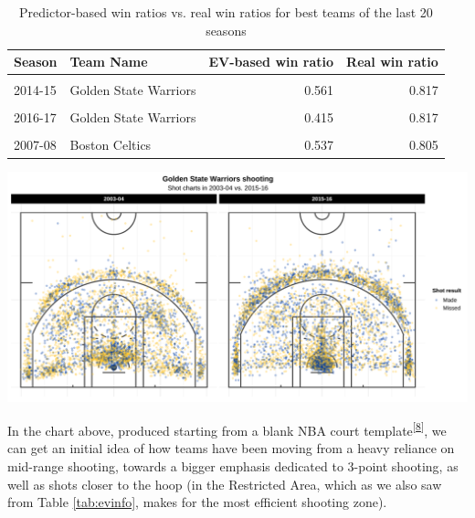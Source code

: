 \documentclass[
  12pt,
  a4paper,
]{article}
\let\origfigure\figure
\let\endorigfigure\endfigure
\renewenvironment{figure}[1][2] {
    \expandafter\origfigure\expandafter[H]
} {
    \endorigfigure
}
\begin{document}
\begin{table}[H]

\caption{\label{tab:teamspct}Predictor-based win ratios
                 vs. real win ratios for best
                 teams of the last 20 seasons}
\centering
\begin{tabular}[t]{llrr}
\toprule
Season & Team Name & EV-based win ratio & Real win ratio\\
\midrule
\cellcolor{gray!30}{2015-16} & \cellcolor{gray!30}{Golden State Warriors} & \cellcolor{gray!30}{0.573} & \cellcolor{gray!30}{0.890}\\
2014-15 & Golden State Warriors & 0.561 & 0.817\\
\cellcolor{gray!30}{2015-16} & \cellcolor{gray!30}{San Antonio Spurs} & \cellcolor{gray!30}{0.439} & \cellcolor{gray!30}{0.817}\\
2016-17 & Golden State Warriors & 0.415 & 0.817\\
\cellcolor{gray!30}{2006-07} & \cellcolor{gray!30}{Dallas Mavericks} & \cellcolor{gray!30}{0.573} & \cellcolor{gray!30}{0.805}\\
2007-08 & Boston Celtics & 0.537 & 0.805\\
\bottomrule
\end{tabular}
\end{table}

\begin{figure}

{\centering \includegraphics[width=1\linewidth]{latex/plots/plot_3} 

}

\caption{Golden State Warriors shooting charts in 2003-04 and 2015-16}\label{fig:warriors}
\end{figure}

In the chart above, produced starting from a blank NBA court template\textsuperscript{{[}\protect\hyperlink{ref-BasketballCourtR}{8}{]}}, we can get an initial idea of how teams have been moving from a heavy reliance on mid-range shooting, towards a bigger emphasis dedicated to 3-point shooting, as well as shots closer to the hoop (in the Restricted Area, which as we also saw from Table \ref{tab:evinfo}, makes for the most efficient shooting zone).
\end{document}

